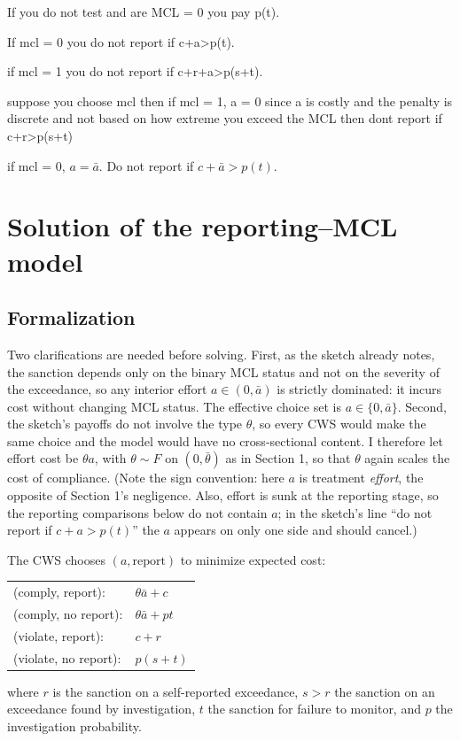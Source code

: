 \documentclass{article}
\begin{document}
If you do not test and are MCL = 0 you pay p(t).

If mcl = 0 you do not report if c+a>p(t).

if mcl = 1 you do not report if c+r+a>p(s+t).

suppose you choose mcl then if mcl = 1, a = 0 since a is costly and the penalty is discrete and not based on how extreme you exceed the MCL then dont report if c+r>p(s+t)

if mcl = 0, $a=\bar{a}$. Do not report if $c+\bar{a}>p(t)$.

\section{Solution of the reporting--MCL model}

\subsection{Formalization}

Two clarifications are needed before solving. First, as the sketch already notes, the sanction depends only on the binary MCL status and not on the severity of the exceedance, so any interior effort $a \in (0,\bar{a})$ is strictly dominated: it incurs cost without changing MCL status. The effective choice set is $a \in \{0, \bar{a}\}$. Second, the sketch's payoffs do not involve the type $\theta$, so every CWS would make the same choice and the model would have no cross-sectional content. I therefore let effort cost be $\theta a$, with $\theta \sim F$ on $(0,\bar{\theta})$ as in Section 1, so that $\theta$ again scales the cost of compliance. (Note the sign convention: here $a$ is treatment \emph{effort}, the opposite of Section 1's negligence. Also, effort is sunk at the reporting stage, so the reporting comparisons below do not contain $a$; in the sketch's line ``do not report if $c+a>p(t)$'' the $a$ appears on only one side and should cancel.)

The CWS chooses $(a, \text{report})$ to minimize expected cost:
\begin{center}
\begin{tabular}{ll}
(comply, report): & $\theta\bar{a} + c$ \\
(comply, no report): & $\theta\bar{a} + pt$ \\
(violate, report): & $c + r$ \\
(violate, no report): & $p(s+t)$ \\
\end{tabular}
\end{center}
where $r$ is the sanction on a self-reported exceedance, $s>r$ the sanction on an exceedance found by investigation, $t$ the sanction for failure to monitor, and $p$ the investigation probability.
\end{document}
